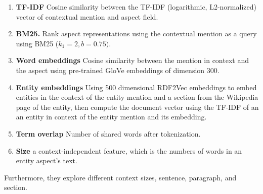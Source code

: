 \begin{enumerate}
    \item \textbf{TF-IDF} Cosine similarity between the TF-IDF (logarithmic, L2-normalized) vector of contextual mention and aspect field.
    \item \textbf{BM25.} Rank aspect representations using the contextual mention as a query using BM25 ($k_1=2, b=0.75)$.
    \item \textbf{Word embeddings} Cosine similarity between the mention in context and
the aspect using pre-trained GloVe \cite{pennington2014glove} embeddings of dimension 300. 
    \item \textbf{Entity embeddings} Using 500 dimensional RDF2Vec \cite{ristoski2016rdf2vec} embeddings to embed entities in the context of the entity mention and a section from the Wikipedia page of the entity, then compute the document vector using the TF-IDF of an an entity in context of the entity mention and its embedding.
    \item \textbf{Term overlap} Number of shared words after tokenization.
    \item \textbf{Size} a context-independent feature, which is the numbers of words in an entity aspect's text.
\end{enumerate}

Furthermore, they explore different context sizes, sentence, paragraph, and section.











